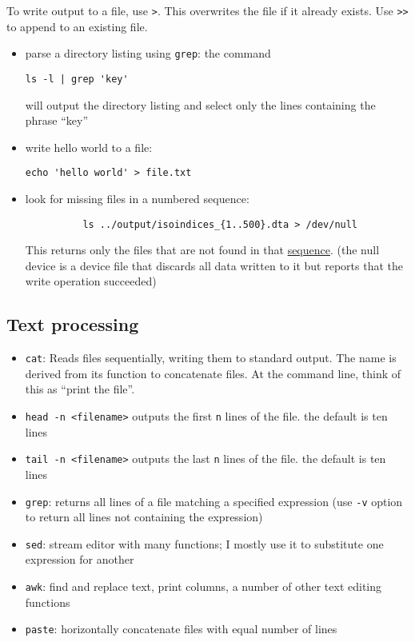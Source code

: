 To write output to a file, use \texttt{>}.
This overwrites the file if it already exists.
Use \texttt{>>} to append to an existing file.


\begin{itemize}
	\item parse a directory listing using \texttt{grep}: the command 
	\begin{verbatim}ls -l | grep 'key'\end{verbatim}
	will output the directory listing and select only the lines containing the phrase ``key''
	\item write hello world to a file:
	\begin{verbatim}echo 'hello world' > file.txt\end{verbatim}
	\item look for missing files in a numbered sequence:
		  \begin{verbatim}
		  ls ../output/isoindices_{1..500}.dta > /dev/null
		  \end{verbatim}
		  This returns only the files that are not found in that \href{http://www.thelinuxrain.com/articles/building-sequences-of-numbers-on-the-command-line}{sequence}.
		  (the null device is a device file that discards all data written to it but reports that the write operation succeeded)
\end{itemize}

\subsection{Text processing}

\begin{itemize}
	\item \texttt{cat}: Reads files sequentially, writing them to standard output. The name is derived from its function to concatenate files. At the command line, think of this as ``print the file''.
	\item \texttt{head -n <filename>} outputs the first \texttt{n} lines of the file. the default is ten lines
	\item \texttt{tail -n <filename>} outputs the last \texttt{n} lines of the file. the default is ten lines
	\item \texttt{grep}: returns all lines of a file matching a specified expression (use \texttt{-v} option to return all lines not containing the expression)
	\item \texttt{sed}: stream editor with many functions; I mostly use it to substitute one expression for another
	\item \texttt{awk}: find and replace text, print columns, a number of other text editing functions
	\item \texttt{paste}: horizontally concatenate files with equal number of lines
\end{itemize}

